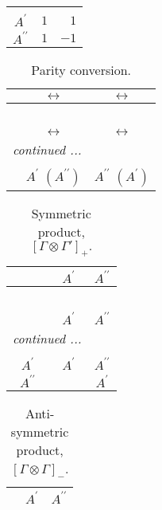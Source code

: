 \documentclass[fleqn,10pt,landscape]{article}
\begin{document}
\begin{itemize}
\begin{center}
\begin{longtable}{c|rr}
 \hline \hline
\multicolumn{2}{r}{} \\ \endlastfoot

$ A^{\prime} $ & $ 1 $ & $ 1 $ \\
$ A^{\prime\prime} $ & $ 1 $ & $ -1 $ \\
\end{longtable}
\end{center}
\begin{center}
\renewcommand{\arraystretch}{1.0}
\begin{longtable}{ccc}
\caption{Parity conversion.}
 \\
 \hline \hline
 & $\leftrightarrow$ & $\leftrightarrow$ \\ \hline \endfirsthead

\multicolumn{2}{l}{\tablename\ \thetable{}} \\
 \hline \hline
 & $\leftrightarrow$ & $\leftrightarrow$ \\ \hline \endhead

 \hline \hline
\multicolumn{2}{r}{\footnotesize\it continued ...} \\ \endfoot

 \hline \hline
\multicolumn{2}{r}{} \\ \endlastfoot

 & $ A^{\prime}\,\,(A^{\prime\prime}) $ & $ A^{\prime\prime}\,\,(A^{\prime}) $ \\
\end{longtable}
\end{center}
\begin{center}
\renewcommand{\arraystretch}{1.0}
\begin{longtable}{c|cc}
\caption{Symmetric product, $[\Gamma\otimes\Gamma']_+.$}
 \\
 \hline \hline
 & $ A^{\prime} $ & $ A^{\prime\prime} $ \\ \hline \endfirsthead

\multicolumn{2}{l}{\tablename\ \thetable{}} \\
 \hline \hline
 & $ A^{\prime} $ & $ A^{\prime\prime} $ \\ \hline \endhead

 \hline \hline
\multicolumn{2}{r}{\footnotesize\it continued ...} \\ \endfoot

 \hline \hline
\multicolumn{2}{r}{} \\ \endlastfoot

$ A^{\prime} $ & $ A^{\prime} $ & $ A^{\prime\prime} $ \\
$ A^{\prime\prime} $ & $  $ & $ A^{\prime} $ \\
\end{longtable}
\end{center}
\begin{center}
\renewcommand{\arraystretch}{1.0}
\begin{longtable}{ccc}
\caption{Anti-symmetric product, $[\Gamma\otimes\Gamma]_-$.}
 \\
 \hline \hline
 & $ A^{\prime} $ & $ A^{\prime\prime} $ \\ \hline \endfirsthead


\end{longtable}
\end{center}
\end{itemize}
\end{document}
